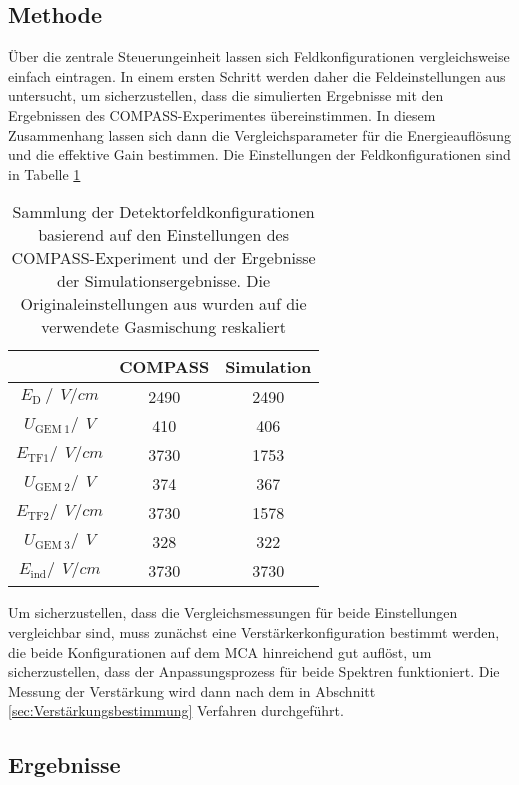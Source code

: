 		\subsection{Methode}
		Über die zentrale Steuerungeinheit lassen sich Feldkonfigurationen vergleichsweise einfach eintragen. In einem ersten Schritt werden daher die Feldeinstellungen aus \cite{ottnad} untersucht, um sicherzustellen, dass die simulierten Ergebnisse mit den Ergebnissen des COMPASS-Experimentes übereinstimmen. In diesem Zusammenhang lassen sich dann die Vergleichsparameter für die Energieauflösung und die effektive Gain bestimmen. Die Einstellungen der Feldkonfigurationen sind in Tabelle \ref{tab:RefKonfig}
		\begin{table}[h!]
			\centering
			\begin{tabular}{|c|c|c|}
				\hline
				&COMPASS & Simulation \\
				\hline
				$E_{\text{D}}\ / \ \ \si{V/cm}$ & 2490 & 2490\\
				\hline
				$U_{\text{GEM}\ 1}/\ \ V$ & 410 & 406  \\
				\hline
				$E_{\text{TF}1} /\ \ \si{V/cm}$ & 3730 & 1753 \\
				\hline
				$U_{\text{GEM}\ 2}/\ \ V$ & 374 & 367  \\
				\hline
				$E_{\text{TF}2} /\ \ \si{V/cm}$ & 3730 & 1578 \\
				\hline
				$U_{\text{GEM}\ 3}/\ \ V$ & 328 & 322  \\
				\hline
				$E_{\text{ind}}/\ \ \si{V/cm}$ & 3730 & 3730  \\
				\hline
			\end{tabular}
			\caption{Sammlung der Detektorfeldkonfigurationen basierend auf den Einstellungen des COMPASS-Experiment und der Ergebnisse der Simulationsergebnisse. Die Originaleinstellungen aus \cite{ottnad} wurden auf die verwendete Gasmischung reskaliert}
			\label{tab:RefKonfig}
		\end{table}
		
		
		
		\noindent Um sicherzustellen, dass die Vergleichsmessungen für beide Einstellungen vergleichbar sind, muss zunächst eine Verstärkerkonfiguration bestimmt werden, die beide Konfigurationen auf dem MCA hinreichend gut auflöst, um sicherzustellen, dass der Anpassungsprozess für beide Spektren funktioniert. Die Messung der Verstärkung wird dann nach dem in Abschnitt \ref{sec:Verstärkungsbestimmung} Verfahren durchgeführt.
		
		\subsection{Ergebnisse}
		
